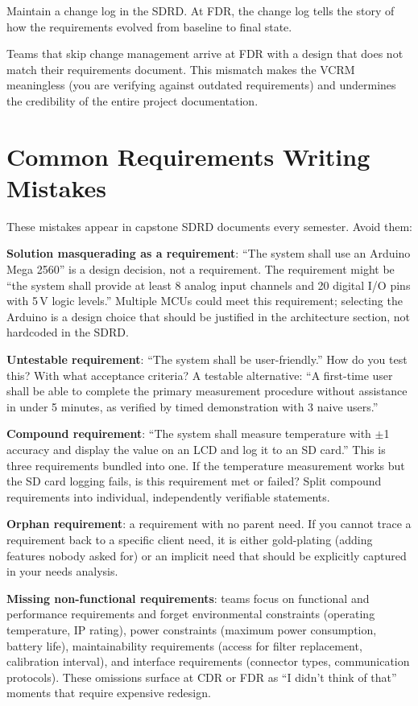 Maintain a change log in the SDRD. At FDR, the change log tells the story of how the requirements evolved from baseline to final state.

Teams that skip change management arrive at FDR with a design that does not match their requirements document. This mismatch makes the VCRM meaningless (you are verifying against outdated requirements) and undermines the credibility of the entire project documentation.

\section{Common Requirements Writing Mistakes}
These mistakes appear in capstone SDRD documents every semester. Avoid them:

\textbf{Solution masquerading as a requirement}: ``The system shall use an Arduino Mega 2560'' is a design decision, not a requirement. The requirement might be ``the system shall provide at least 8 analog input channels and 20 digital I/O pins with 5\,V logic levels.'' Multiple MCUs could meet this requirement; selecting the Arduino is a design choice that should be justified in the architecture section, not hardcoded in the SDRD.

\textbf{Untestable requirement}: ``The system shall be user-friendly.'' How do you test this? With what acceptance criteria? A testable alternative: ``A first-time user shall be able to complete the primary measurement procedure without assistance in under 5 minutes, as verified by timed demonstration with 3 naive users.''

\textbf{Compound requirement}: ``The system shall measure temperature with $\pm$1\,\degC{} accuracy and display the value on an LCD and log it to an SD card.'' This is three requirements bundled into one. If the temperature measurement works but the SD card logging fails, is this requirement met or failed? Split compound requirements into individual, independently verifiable statements.

\textbf{Orphan requirement}: a requirement with no parent need. If you cannot trace a requirement back to a specific client need, it is either gold-plating (adding features nobody asked for) or an implicit need that should be explicitly captured in your needs analysis.

\textbf{Missing non-functional requirements}: teams focus on functional and performance requirements and forget environmental constraints (operating temperature, IP rating), power constraints (maximum power consumption, battery life), maintainability requirements (access for filter replacement, calibration interval), and interface requirements (connector types, communication protocols). These omissions surface at CDR or FDR as ``I didn't think of that'' moments that require expensive redesign.

